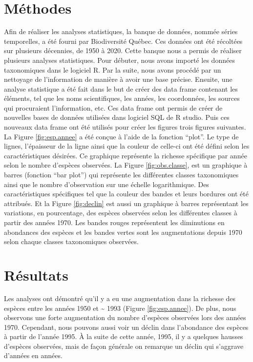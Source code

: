 \documentclass[9pt,twocolumn,twoside,]{pnas-new}
\begin{document}
\section{Méthodes}\label{muxe9thodes}

Afin de réaliser les analyses statistiques, la banque de données, nommée
séries temporelles, a été fourni par Biodiversité Québec. Ces données
ont été récoltées sur plusieurs décennies, de 1950 à 2020. Cette banque
nous a permis de réaliser plusieurs analyses statistiques. Pour débuter,
nous avons importé les données taxonomiques dans le logiciel R. Par la
suite, nous avons procédé par un nettoyage de l'information de manière à
avoir une base précise. Ensuite, une analyse statistique a été fait dans
le but de créer des data frame contenant les éléments, tel que les noms
scientifiques, les années, les coordonnées, les sources qui procuraient
l'information, etc. Ces data frame ont permis de créer de nouvelles
bases de données utilisées dans logiciel SQL de R studio. Puis ces
nouveaux data frame ont été utilisés pour créer les figures trois
figures suivantes. La Figure \ref{fig:esp.annee} a été conçue à l'aide
de la fonction ``plot''. Le type de lignes, l'épaisseur de la ligne
ainsi que la couleur de celle-ci ont été défini selon les
caractéristiques désirées. Ce graphique représente la richesse
spécifique par année selon le nombre d'espèces observées. La Figure
\ref{fig:obs.classe}, est un graphique à barres (fonction ``bar plot'')
qui représente les différentes classes taxonomiques ainsi que le nombre
d'observation sur une échelle logarithmique. Des caractéristiques
spécifiques tel que la couleur des bandes et leurs bordures ont été
attribués. Et la Figure \ref{fig:declin} est aussi un graphique à barres
représentant les variations, en pourcentage, des espèces observées selon
les différentes classes à partir des années 1970. Les bandes rouges
représentent les diminutions en abondances des espèces et les bandes
vertes sont les augmentations depuis 1970 selon chaque classes
taxonomiques observées.

\section{Résultats}\label{ruxe9sultats}

Les analyses ont démontré qu'il y a eu une augmentation dans la richesse
des espèces entre les années 1950 et \textasciitilde{} 1993 (Figure
\ref{fig:esp.annee}). De plus, nous observons une forte augmentation du
nombre d'espèces observées lors des années 1970. Cependant, nous pouvons
aussi voir un déclin dans l'abondance des espèces à partir de l'année
1995. À la suite de cette année, 1995, il y a quelques hausses d'espèces
observées, mais de façon générale on remarque un déclin qui s'aggrave
d'années en années.
\end{document}
